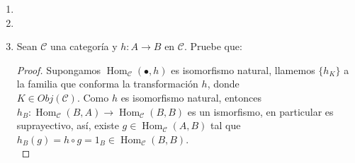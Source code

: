 \documentclass{article}
\begin{document}
\begin{enumerate}
\begin{proof}
y rotando dos veces a la izquierda cada uno por ( TR2 ) sobre $\triangle$ se obtienen $\alpha_0,\beta_0$ y $\gamma_0$ respectivamente, los cuales por 
definición serán elementos de $\tilde{\triangle}$.\\

Como $(\mathscr{C},T,\triangle)$ es categoría triangulada, por el axioma del octaedro existen $g:X'\to Y'$ y $f:Y'\to Z'$ tales que hacen conmutar
 el diagrama (2) y . Así\\
, 
y $f^{op},g^{op}$ hacen conmutar el diagrama (1), pues:
\begin{itemize}
\item[$\bullet$] $f^{op}i^{op}=(if)^{op}=(vk)^{op}=k^{op}v^{op}$\,.
\item[$\bullet$] $-i'=f\circ (-k')$ entonces $(-i')^{op}=(f\circ (-k'))^{op}=-(k')^{op}f^{op}$\\ así $i^{op}=k'^{op}f^{op}$.
\item[$\bullet$] $g^{op}k^{op}=(kg)^{op}=(r)^{op}$.
\item[$\bullet$] $j^{op}g^{op}=(gj)^{op}=(kT^{-1}(u))^{op}=(T^{-1}(u))^{op}k^{op}=\tilde{T}(u^{op})k^{op}$.
\end{itemize}

\end{proof}


\item
\item
\item Sean $\mathscr{C}$ una categoría y $h:A\to B$ en $\mathscr{C}$. Pruebe que: \\
\centerline{
}
\begin{proof}

Supongamos $\operatorname{Hom}_{\mathscr{C}}(\bullet,h)$ es isomorfismo natural, llamemos $\{h_K\}$ a la familia que conforma la
transformación $h$, donde \\$K\in Obj(\mathscr{C})$. Como $h$ es isomorfismo natural, entonces \\$h_B:\operatorname{Hom}_{\mathscr{C}}(B,A)
\longrightarrow \operatorname{Hom}_{\mathscr{C}}(B,B)$ es un ismorfismo, en particular es suprayectivo, así, existe 
$g\in \operatorname{Hom}_{\mathscr{C}}(A,B)$ tal que \\$h_B(g)=h\circ g=1_B\in \operatorname{Hom}_{\mathscr{C}}(B,B)$.\\


\end{proof}
\end{enumerate}
\end{document}
